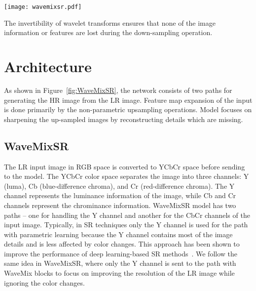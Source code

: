 \documentclass{article}
\begin{document}
\begin{figure*}[ht]

\centering
\texttt{[image: wavemixsr.pdf]}
\caption{Architecture of WaveMixSR along with the details of the WaveMix block. Architecture is shown for $2\times$ super-resolution. For $3\times$  and $4\times$ super-resolution, we only modify the upsample blocks in the architecture keeping the other blocks intact.}
\label{fig:WaveMixSR}

\end{figure*}
The invertibility of wavelet transforms ensures that none of the image information or features are lost during the down-sampling operation.

\section{Architecture}

As shown in Figure~\ref{fig:WaveMixSR}, the network consists of two paths for generating the HR image from the LR image. Feature map expansion of the input is done primarily by the non-parametric upsampling operations. Model focuses on sharpening the up-sampled images by reconstructing details which are missing. 

\subsection{WaveMixSR}


The LR input image in RGB space is converted to YCbCr space before sending to the model. The YCbCr color space separates the image into three channels: Y (luma), Cb (blue-difference chroma), and Cr (red-difference chroma). The Y channel represents the luminance information of the image, while Cb and Cr channels represent the chrominance information. WaveMixSR model has two paths -- one for handling the Y channel and another for the CbCr channels of the input image. Typically, in SR techniques only the Y channel is used for the path with parametric learning because the Y channel contains most of the image details and is less affected by color changes. This approach has been shown to improve the performance of deep learning-based SR methods~\cite{dong2015image}. We follow the same idea in WaveMixSR, where only the Y channel is sent to the path with WaveMix blocks to focus on improving the resolution of the LR image while ignoring the color changes.
\end{document}
